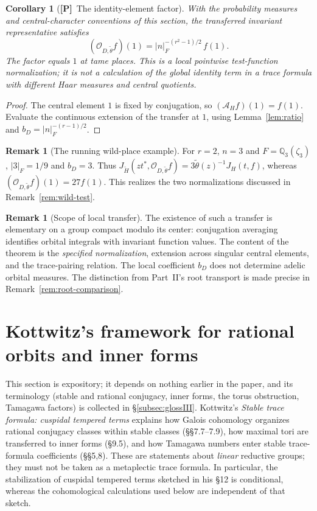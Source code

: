 \documentclass[11pt]{article}
\newcommand{\tH}{\widetilde H}
\newcommand{\Ptag}{\textnormal{\textbf{[P]}}}
\theoremstyle{plain}
\newtheorem{corollary}[theorem]{Corollary}
\theoremstyle{definition}
\newtheorem{remark}[theorem]{Remark}
\begin{document}
\begin{corollary}[\Ptag\ The identity-element factor]\label{cor:identity-factor}
With the probability measures and central-character conventions of this
section, the transferred invariant representative satisfies
\begin{equation}\label{eq:identity-factor}
\boxed{\quad(\mathcal O_{D,\widetilde\theta}f)(1)
=|n|_F^{-(r^2-1)/2}\,f(1).\quad}
\end{equation}
The factor equals $1$ at tame places. This is a local pointwise test-function
normalization; it is \emph{not} a calculation of the global identity term
in a trace formula with different Haar measures and central quotients.
\end{corollary}
\begin{proof}
The central element $1$ is fixed by conjugation, so
$(\mathcal A_Hf)(1)=f(1)$. Evaluate the continuous extension of the
transfer at $1$, using Lemma~\ref{lem:ratio} and
$b_D=|n|_F^{-(r-1)/2}$.
\end{proof}

\begin{remark}[The running wild-place example]
For $r=2$, $n=3$ and $F=\mathbb Q_3(\zeta_3)$,
$|3|_F=1/9$ and $b_D=3$. Thus
$J_{\tH}(z t^*,\mathcal O_{D,\widetilde\theta}f)=3\widetilde\theta(z)^{-1}J_H(t,f)$,
whereas $(\mathcal O_{D,\widetilde\theta}f)(1)=27f(1)$. This realizes the two
normalizations discussed in Remark~\ref{rem:wild-test}.
\end{remark}

\begin{remark}[Scope of local transfer]\label{rem:OI-scope}
The existence of such a transfer is elementary on a group compact
modulo its center: conjugation averaging identifies orbital integrals
with invariant function values. The content of the theorem is the
\emph{specified normalization}, extension across singular central
elements, and the trace-pairing relation. The local coefficient
$b_D$ does not determine adelic orbital measures. The distinction from Part~II's root transport is made precise in Remark~\ref{rem:root-comparison}.
\end{remark}


\section{Kottwitz's framework for rational orbits and inner forms}
\label{sec:kottwitz}
This section is expository; it depends on nothing earlier in the paper, and its terminology (stable and rational conjugacy, inner forms, the torus obstruction, Tamagawa factors) is collected in \S\ref{subsec:glossIII}.
Kottwitz's \emph{Stable trace formula: cuspidal tempered terms}
\cite{Kottwitz84} explains how Galois cohomology organizes rational
conjugacy classes within stable classes (\S\S7.7--7.9), how maximal
tori are transferred to inner forms (\S9.5), and how Tamagawa
numbers enter stable trace-formula coefficients (\S\S5,8).
These are statements about \emph{linear} reductive groups; they
must not be taken as a metaplectic trace formula. In particular,
the stabilization of cuspidal tempered terms sketched in his \S12
is conditional, whereas the cohomological calculations used below
are independent of that sketch.
\end{document}
